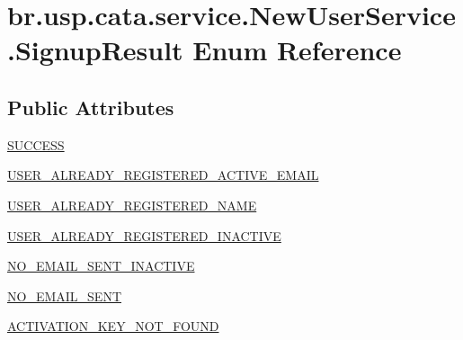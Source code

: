 \hypertarget{enumbr_1_1usp_1_1cata_1_1service_1_1_new_user_service_1_1_signup_result}{\section{br.\+usp.\+cata.\+service.\+New\+User\+Service.\+Signup\+Result Enum Reference}
\label{enumbr_1_1usp_1_1cata_1_1service_1_1_new_user_service_1_1_signup_result}
}
\subsection*{Public Attributes}
\begin{DoxyCompactItemize}
\item 
\hyperlink{enumbr_1_1usp_1_1cata_1_1service_1_1_new_user_service_1_1_signup_result_a88c8162e6b6679cb3d39d7d111640edf}{S\+U\+C\+C\+E\+S\+S}
\item 
\hyperlink{enumbr_1_1usp_1_1cata_1_1service_1_1_new_user_service_1_1_signup_result_a803b9d04c0b664683620ff14690b40b7}{U\+S\+E\+R\+\_\+\+A\+L\+R\+E\+A\+D\+Y\+\_\+\+R\+E\+G\+I\+S\+T\+E\+R\+E\+D\+\_\+\+A\+C\+T\+I\+V\+E\+\_\+\+E\+M\+A\+I\+L}
\item 
\hyperlink{enumbr_1_1usp_1_1cata_1_1service_1_1_new_user_service_1_1_signup_result_a4c2e71e31093349767e83f8b365e0afb}{U\+S\+E\+R\+\_\+\+A\+L\+R\+E\+A\+D\+Y\+\_\+\+R\+E\+G\+I\+S\+T\+E\+R\+E\+D\+\_\+\+N\+A\+M\+E}
\item 
\hyperlink{enumbr_1_1usp_1_1cata_1_1service_1_1_new_user_service_1_1_signup_result_a1dfdc90f0de867cc0429c089f8643701}{U\+S\+E\+R\+\_\+\+A\+L\+R\+E\+A\+D\+Y\+\_\+\+R\+E\+G\+I\+S\+T\+E\+R\+E\+D\+\_\+\+I\+N\+A\+C\+T\+I\+V\+E}
\item 
\hyperlink{enumbr_1_1usp_1_1cata_1_1service_1_1_new_user_service_1_1_signup_result_a29da95a8a069e03bc62ae559384810d7}{N\+O\+\_\+\+E\+M\+A\+I\+L\+\_\+\+S\+E\+N\+T\+\_\+\+I\+N\+A\+C\+T\+I\+V\+E}
\item 
\hyperlink{enumbr_1_1usp_1_1cata_1_1service_1_1_new_user_service_1_1_signup_result_abd680ba2f4467de5e677086c726a6c0c}{N\+O\+\_\+\+E\+M\+A\+I\+L\+\_\+\+S\+E\+N\+T}
\item 
\hyperlink{enumbr_1_1usp_1_1cata_1_1service_1_1_new_user_service_1_1_signup_result_ac182f47e54b425d3c13e4dfdd2c5fdac}{A\+C\+T\+I\+V\+A\+T\+I\+O\+N\+\_\+\+K\+E\+Y\+\_\+\+N\+O\+T\+\_\+\+F\+O\+U\+N\+D}
\end{DoxyCompactItemize}


